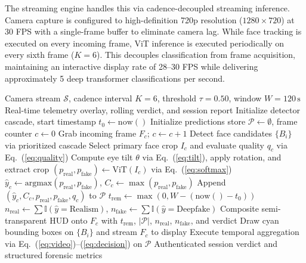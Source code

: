 \documentclass[conference]{IEEEtran}
\begin{document}
The streaming engine handles this via cadence-decoupled streaming inference. Camera capture is configured to high-definition 720p resolution ($1280\times720$) at 30 FPS with a single-frame buffer to eliminate camera lag. While face tracking is executed on every incoming frame, ViT inference is executed periodically on every sixth frame ($K=6$). This decouples classification from frame acquisition, maintaining an interactive display rate of 28--30 FPS while delivering approximately 5 deep transformer classifications per second.

\begin{algorithm}[t]
\caption{Real-Time Live Webcam Detection and Telemetry HUD}
\label{alg:webcam}
\begin{algorithmic}[1]
\footnotesize
\Require Camera stream $\mathcal{S}$, cadence interval $K=6$, threshold $\tau=0.50$, window $W=120\,\text{s}$
\Ensure Real-time telemetry overlay, rolling verdict, and session report
\State Initialize detector cascade, start timestamp $t_0 \leftarrow \mathrm{now}()$
\State Initialize predictions store $\mathcal{P} \leftarrow \emptyset$, frame counter $c \leftarrow 0$
  \State Grab incoming frame $F_c$; $c \leftarrow c + 1$
  \State Detect face candidates $\{B_i\}$ via prioritized cascade
    \State Select primary face crop $I_c$ and evaluate quality $q_c$ via Eq.~(\ref{eq:quality})
      \State Compute eye tilt $\theta$ via Eq.~(\ref{eq:tilt}), apply rotation, and extract crop
      \State $(p_{\mathrm{real}}, p_{\mathrm{fake}}) \leftarrow \mathrm{ViT}(I_c)$ via Eq.~(\ref{eq:softmax})
      \State $\hat{y}_c \leftarrow \mathrm{argmax}(p_{\mathrm{real}}, p_{\mathrm{fake}})$, $C_c \leftarrow \max(p_{\mathrm{real}}, p_{\mathrm{fake}})$
      \State Append $(\hat{y}_c, C_c, p_{\mathrm{real}}, p_{\mathrm{fake}}, q_c)$ to $\mathcal{P}$
    \EndIf
  \EndIf
  \State $t_{\mathrm{rem}} \leftarrow \max(0, W - (\mathrm{now}() - t_0))$
  \State $n_{\mathrm{real}} \leftarrow \sum \mathbb{I}(\hat{y}= \text{Realism})$, $n_{\mathrm{fake}} \leftarrow \sum \mathbb{I}(\hat{y}= \text{Deepfake})$
  \State Composite semi-transparent HUD onto $F_c$ with $t_{\mathrm{rem}}$, $|\mathcal{P}|$, $n_{\mathrm{real}}$, $n_{\mathrm{fake}}$, and verdict
  \State Draw cyan bounding boxes on $\{B_i\}$ and stream $F_c$ to display
\EndWhile
\State Execute temporal aggregation via Eq.~(\ref{eq:video})--(\ref{eq:decision}) on $\mathcal{P}$
\State \Return Authenticated session verdict and structured forensic metrics
\end{algorithmic}
\end{algorithm}
\end{document}

